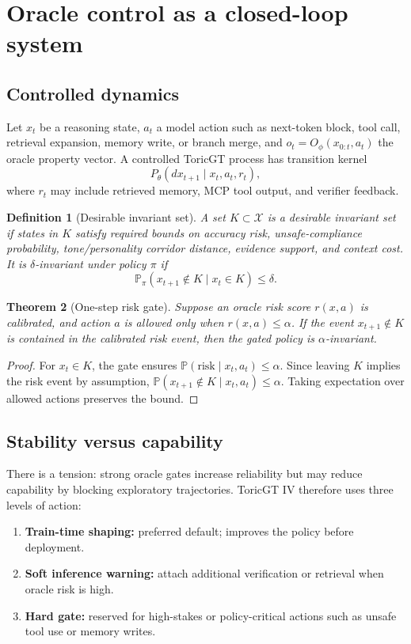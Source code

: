 \documentclass[11pt]{article}
\newtheorem{theorem}{Theorem}[section]
\newtheorem{definition}[theorem]{Definition}
\newcommand{\calX}{\mathcal{X}}
\numberwithin{equation}{section}
\begin{document}
\section{Oracle control as a closed-loop system}
\subsection{Controlled dynamics}
Let $x_t$ be a reasoning state, $a_t$ a model action such as next-token block, tool call, retrieval expansion, memory write, or branch merge, and $o_t=O_\phi(x_{0:t},a_t)$ the oracle property vector. A controlled ToricGT process has transition kernel
\begin{equation}
P_\theta(dx_{t+1}\mid x_t,a_t,r_t),
\end{equation}
where $r_t$ may include retrieved memory, MCP tool output, and verifier feedback.

\begin{definition}[Desirable invariant set]
A set $K\subset\calX$ is a desirable invariant set if states in $K$ satisfy required bounds on accuracy risk, unsafe-compliance probability, tone/personality corridor distance, evidence support, and context cost. It is $\delta$-invariant under policy $\pi$ if
\begin{equation}
\mathbb{P}_\pi(x_{t+1}\notin K\mid x_t\in K)\le\delta.
\end{equation}
\end{definition}

\begin{theorem}[One-step risk gate]
Suppose an oracle risk score $r(x,a)$ is calibrated, and action $a$ is allowed only when $r(x,a)\le \alpha$. If the event $x_{t+1}\notin K$ is contained in the calibrated risk event, then the gated policy is $\alpha$-invariant.
\end{theorem}
\begin{proof}
For $x_t\in K$, the gate ensures $\mathbb{P}(\mathrm{risk}\mid x_t,a_t)\le\alpha$. Since leaving $K$ implies the risk event by assumption, $\mathbb{P}(x_{t+1}\notin K\mid x_t,a_t)\le\alpha$. Taking expectation over allowed actions preserves the bound.
\end{proof}

\subsection{Stability versus capability}
There is a tension: strong oracle gates increase reliability but may reduce capability by blocking exploratory trajectories. ToricGT IV therefore uses three levels of action:
\begin{enumerate}
\item \textbf{Train-time shaping:} preferred default; improves the policy before deployment.
\item \textbf{Soft inference warning:} attach additional verification or retrieval when oracle risk is high.
\item \textbf{Hard gate:} reserved for high-stakes or policy-critical actions such as unsafe tool use or memory writes.
\end{enumerate}
\end{document}
